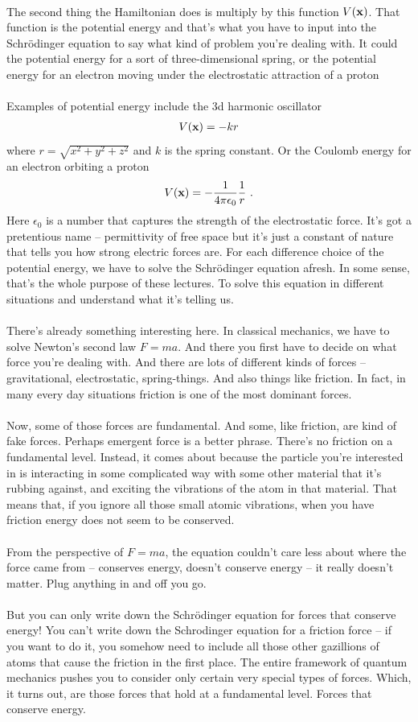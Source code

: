 \documentclass[12pt]{article}
\def\be{\begin{eqnarray}}
\def\ee{\end{eqnarray}}
\newcommand{\nn}{\nonumber}
\newcommand\para{\paragraph{}}
\newcommand{\bx}{{\bf x}}
\begin{document}
\para
The second thing the Hamiltonian does is multiply by this function $V(\bx)$. That function is the potential energy and that's what you have to input into the Schr\"{o}dinger equation to say what kind of problem you're dealing with. It could the potential energy for a sort of three-dimensional spring, or the potential energy for an electron moving under the electrostatic attraction of a proton
%

\para
{\color{olive} Examples of potential energy include the 3d harmonic oscillator
%
\be V(\bx) = -k r\nn\ee
%
where $r = \sqrt{x^2 + y^2 + z^2}$ and $k$ is the spring constant. Or the Coulomb energy for an electron orbiting a proton
%
\be V(\bx) = -\frac{1}{4\pi \epsilon_0} \frac{1}{r}\ .\nn\ee}
%
Here $\epsilon_0$ is a number that captures the strength of the electrostatic force. It's got a pretentious name -- permittivity of free space but it's just a constant of nature that tells you how strong electric forces are. For each difference choice of the potential energy, we have to solve the Schr\"{o}dinger equation afresh. In some sense, that's the whole purpose of these lectures. To solve this equation in different situations and understand what it's telling us. 

\para
There's already something interesting here. In classical mechanics, we have to solve Newton's second law $F=ma$. And there you first have to decide on what force you're dealing with. And there are lots of different kinds of forces -- gravitational, electrostatic, spring-things. And also things like friction. In fact, in many every day situations friction is one of the most dominant forces. 

\para
Now, some of those forces are fundamental. And some, like friction, are kind of fake forces. Perhaps emergent force is a better phrase. There's no friction on a fundamental level. Instead, it comes about because the particle you're interested in is interacting in some complicated way with some other material that it's rubbing against, and exciting the vibrations of the atom in that material. That means that, if you ignore all those small atomic vibrations, when you have friction energy does not seem to be conserved.

\para
From the perspective of $F=ma$, the equation couldn't care less about where the force came from -- conserves energy, doesn't conserve energy -- it really doesn't matter. Plug anything in and off you go.

\para
But you can only write down the Schr\"{o}dinger equation for forces that conserve energy! You can't write down the Schrodinger equation for a friction force -- if you want to do it, you somehow need to include all those other gazillions of atoms that cause the friction in the first place. The entire framework of quantum mechanics pushes you to consider only certain very special types of forces. Which, it turns out, are those forces that hold at a fundamental level. Forces that conserve energy. 
\end{document}
